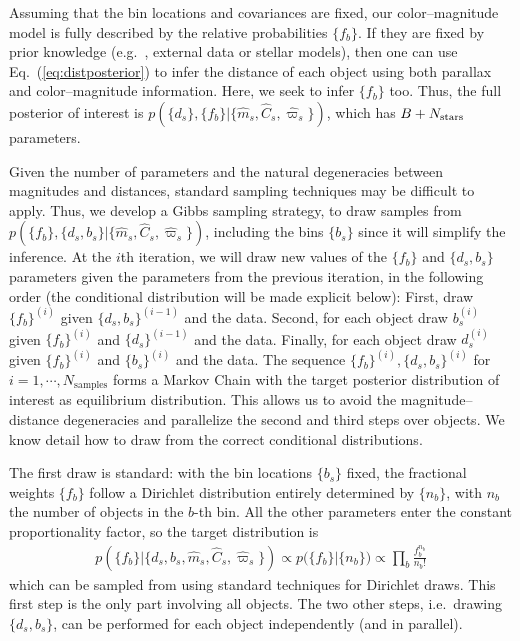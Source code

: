 \documentclass[aps,prd,showpacs,superscriptaddress,groupedaddress]{revtex4}  %
\newcommand{\ie}{{{i.e.}~}}
\newcommand{\eg}{{{e.g.}~}}
\newcommand{\equref}[1]{{\xspace}Eq.~(\ref{#1})}
\newcommand{\eqn}[1]{\begin{eqnarray}#1\end{eqnarray}}
\newcommand{\nobj}{{N_{\rm stars}}}
\begin{document}
Assuming that the bin locations and covariances are fixed, our color--magnitude model is fully described by the relative probabilities $\{ f_{b} \}$. 
If they are fixed by prior knowledge (\eg, external data or stellar models), then one can use \equref{eq:distposterior} to infer the distance of each object using both parallax and color--magnitude information.
Here, we seek to infer $\{ f_{b} \}$ too.
Thus, the full posterior of interest is $p(\{ d_s \}, \{ f_{b} \} | \{ \hat{m}_s, \hat{C}_s, \hat{\varpi}_s \})$, which has $B + \nobj$ parameters.

Given the number of parameters and the natural degeneracies between magnitudes and distances, standard sampling techniques may be difficult to apply.
Thus, we develop a Gibbs sampling strategy, to draw samples from $p(\{ f_{b} \},\{d_s, b_s\}  \rvert \{\hat{m}_s, \hat{C}_s, \hat{\varpi}_s\})$, including the bins $\{ b_s\}$ since it will simplify the inference. 
At the $i$th iteration, we will draw new values of the $\{ f_{b} \}$ and $\{d_s, b_s\}$ parameters given the parameters from the previous iteration, in the following order (the conditional distribution will be made explicit below):
First, draw $\{ f_{b} \}^{(i)}$ given $\{d_s, b_s\}^{(i-1)}$ and the data. 
Second, for each object draw $b_s^{(i)}$ given $\{ f_{b} \}^{(i)}$ and $\{d_s\}^{(i-1)}$ and the data. 
Finally, for each object draw $d_s^{(i)}$ given $\{ f_{b} \}^{(i)}$ and $\{b_s\}^{(i)}$ and the data.
The sequence $\{ f_{b} \}^{(i)},\{d_s, b_s\}^{(i)}$ for $i=1, \cdots, N_\mathrm{samples}$ forms a Markov Chain with the target posterior distribution of interest as equilibrium distribution.
This allows us to avoid the magnitude--distance degeneracies and parallelize the second and third steps over objects.
We know detail how to draw from the correct conditional distributions.

The first draw is standard: with the bin locations $\{b_s\}$ fixed, the fractional weights $\{ f_{b} \}$ follow a Dirichlet distribution entirely determined by $\{n_b \}$, with $n_b$ the number of objects in the $b$-th bin.
All the other parameters enter the constant proportionality factor, so the target distribution is
\eqn{
	p\left(\bigl\{ f_b \bigr\} \bigr\rvert \bigl\{ d_s, b_s, \hat{m}_s, \hat{C}_s, \hat{\varpi}_s \bigr\} \right) \propto p\bigl( \bigl\{ f_b \bigr\} \bigr\rvert \{n_b \} \bigr) \propto \prod_b \frac{ f_b^{n_b} }{n_b !}
}
which can be sampled from using standard techniques for Dirichlet draws.
This first step is the only part involving all objects. The two other steps, \ie drawing $\{d_s, b_s\}$, can be performed for each object independently (and in parallel).
\end{document}
